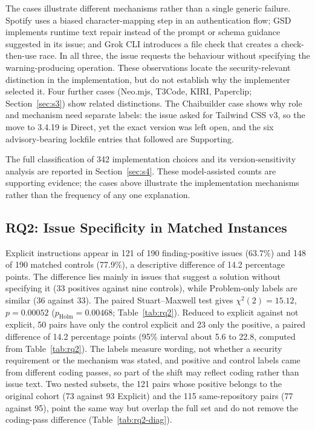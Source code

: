 \documentclass[acmsmall,screen,nonacm]{acmart}
\begin{document}
The cases illustrate different mechanisms rather than a single generic failure. Spotify uses a biased character-mapping step in an authentication flow; GSD implements runtime text repair instead of the prompt or schema guidance suggested in its issue; and Grok CLI introduces a file check that creates a check-then-use race. In all three, the issue requests the behaviour without specifying the warning-producing operation. These observations locate the security-relevant distinction in the implementation, but do not establish why the implementer selected it. Four further cases (Neo.mjs, T3Code, KIRI, Paperclip; Section~\ref{sec:s3}) show related distinctions. The Chaibuilder case shows why role and mechanism need separate labels: the issue asked for Tailwind CSS v3, so the move to 3.4.19 is Direct, yet the exact version was left open, and the six advisory-bearing lockfile entries that followed are Supporting.

The full classification of 342 implementation choices and its version-sensitivity analysis are reported in Section~\ref{sec:s4}. These model-assisted counts are supporting evidence; the cases above illustrate the implementation mechanisms rather than the frequency of any one explanation.

\subsection{RQ2: Issue Specificity in Matched Instances}\label{sec:rq2-res}

Explicit instructions appear in 121 of 190 finding-positive issues (63.7\%) and 148 of 190 matched controls (77.9\%), a descriptive difference of 14.2 percentage points. The difference lies mainly in issues that suggest a solution without specifying it (33 positives against nine controls), while Problem-only labels are similar (36 against 33). The paired Stuart--Maxwell test gives $\chi^2(2)=15.12$, $p=0.00052$ ($p_{\mathrm{Holm}}=0.00468$; Table~\ref{tab:rq2}). Reduced to explicit against not explicit, 50 pairs have only the control explicit and 23 only the positive, a paired difference of 14.2 percentage points (95\% interval about 5.6 to 22.8, computed from Table~\ref{tab:rq2}). The labels measure wording, not whether a security requirement or the mechanism was stated, and positive and control labels came from different coding passes, so part of the shift may reflect coding rather than issue text. Two nested subsets, the 121 pairs whose positive belongs to the original cohort (73 against 93 Explicit) and the 115 same-repository pairs (77 against 95), point the same way but overlap the full set and do not remove the coding-pass difference (Table~\ref{tab:rq2-diag}).
\end{document}
